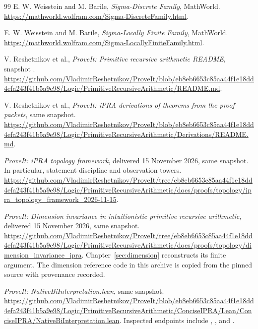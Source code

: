 \begin{thebibliography}{99}
E. W. Weisstein and M. Barile, \emph{Sigma-Discrete Family}, MathWorld.
\url{https://mathworld.wolfram.com/Sigma-DiscreteFamily.html}.

E. W. Weisstein and M. Barile, \emph{Sigma-Locally Finite Family}, MathWorld.
\url{https://mathworld.wolfram.com/Sigma-LocallyFiniteFamily.html}.

V. Reshetnikov et al., \emph{ProveIt: Primitive recursive arithmetic README},
snapshot .
\url{https://github.com/VladimirReshetnikov/ProveIt/blob/eb8eb6653c85aa44f1e18dd4efa243f41b5a9e98/Logic/PrimitiveRecursiveArithmetic/README.md}.

V. Reshetnikov et al., \emph{ProveIt: iPRA derivations of theorems from the proof packets},
same snapshot.
\url{https://github.com/VladimirReshetnikov/ProveIt/blob/eb8eb6653c85aa44f1e18dd4efa243f41b5a9e98/Logic/PrimitiveRecursiveArithmetic/Derivations/README.md}.

\emph{ProveIt: iPRA topology framework}, delivered 15 November 2026,
same snapshot. In particular, statement discipline and observation towers.
\url{https://github.com/VladimirReshetnikov/ProveIt/tree/eb8eb6653c85aa44f1e18dd4efa243f41b5a9e98/Logic/PrimitiveRecursiveArithmetic/docs/proofs/topology/ipra_topology_framework_2026-11-15}.

\emph{ProveIt: Dimension invariance in intuitionistic primitive recursive arithmetic},
delivered 15 November 2026, same snapshot.
\url{https://github.com/VladimirReshetnikov/ProveIt/tree/eb8eb6653c85aa44f1e18dd4efa243f41b5a9e98/Logic/PrimitiveRecursiveArithmetic/docs/proofs/topology/dimension_invariance_ipra}.
Chapter~\ref{sec:dimension} reconstructs its finite argument. The dimension reference code in this archive is copied from the pinned source with provenance recorded.

\emph{ProveIt: NativeBiInterpretation.lean}, same snapshot.
\url{https://github.com/VladimirReshetnikov/ProveIt/blob/eb8eb6653c85aa44f1e18dd4efa243f41b5a9e98/Logic/PrimitiveRecursiveArithmetic/ConciseIPRA/Lean/ConciseIPRA/NativeBiInterpretation.lean}.
Inspected endpoints include , , and .

\end{thebibliography}


